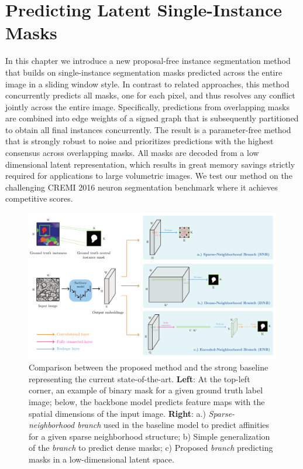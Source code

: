 \chapter{Predicting Latent Single-Instance Masks}\label{chapter:LSI}

In this chapter we introduce a new proposal-free instance segmentation method that builds on single-instance segmentation masks predicted across the entire image in a sliding window style.
In contrast to related approaches, this method concurrently predicts all masks, one for each pixel, and thus resolves any conflict jointly across the entire image.
Specifically, predictions from overlapping masks are combined into edge weights of a signed graph that is subsequently partitioned to obtain all final instances concurrently.
The result is a parameter-free method that is strongly robust to noise and prioritizes predictions with the highest consensus across overlapping masks. 
All masks are decoded from a low dimensional latent representation, which results in great memory savings strictly required for applications to large volumetric images. 
We test our method on the challenging CREMI 2016 neuron segmentation benchmark where it achieves competitive scores. 

\begin{figure}[t]
\centering
        \includegraphics[width=\textwidth]{./figures/LSIMasks/main_fig.pdf} %
        \caption{Comparison between the proposed method and the strong baseline representing the current state-of-the-art. \textbf{Left}: At the top-left corner, an example of binary \maskname mask for a given ground truth label image; below, the backbone model predicts feature maps with the spatial dimensions of the input image. \textbf{Right}: a.) \emph{Sparse-neighborhood branch} used in the baseline model to predict affinities for a given sparse neighborhood structure; b) Simple generalization of the \emph{\sparseBr branch} to predict dense \maskname masks; c) Proposed \emph{\encBr branch} predicting \maskname masks in a low-dimensional latent space.}
    \label{fig:main_figure}
\end{figure}




